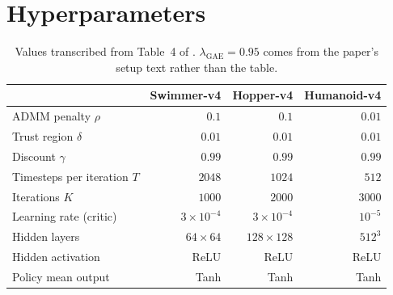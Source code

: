 \section{Hyperparameters}
\label{app:hyperparameters}

\begin{table}[t]
  \centering
  \caption{Values transcribed from Table~4 of \citet{lan2023fednpgadmm}.
  $\lambda_{\text{GAE}} = 0.95$ comes from the paper's setup text rather than
  the table.}
  \label{tab:table4}
  \begin{tabular}{lrrr}
    \toprule
     & Swimmer-v4 & Hopper-v4 & Humanoid-v4 \\
    \midrule
    ADMM penalty $\rho$        & $0.1$   & $0.1$   & $0.01$ \\
    Trust region $\delta$      & $0.01$  & $0.01$  & $0.01$ \\
    Discount $\gamma$          & $0.99$  & $0.99$  & $0.99$ \\
    Timesteps per iteration $T$& $2048$  & $1024$  & $512$ \\
    Iterations $K$             & $1000$  & $2000$  & $3000$ \\
    Learning rate (critic)     & $3\times10^{-4}$ & $3\times10^{-4}$ & $10^{-5}$ \\
    Hidden layers              & $64\times64$ & $128\times128$ & $512^{3}$ \\
    Hidden activation          & ReLU & ReLU & ReLU \\
    Policy mean output         & Tanh & Tanh & Tanh \\
    \bottomrule
  \end{tabular}
\end{table}

